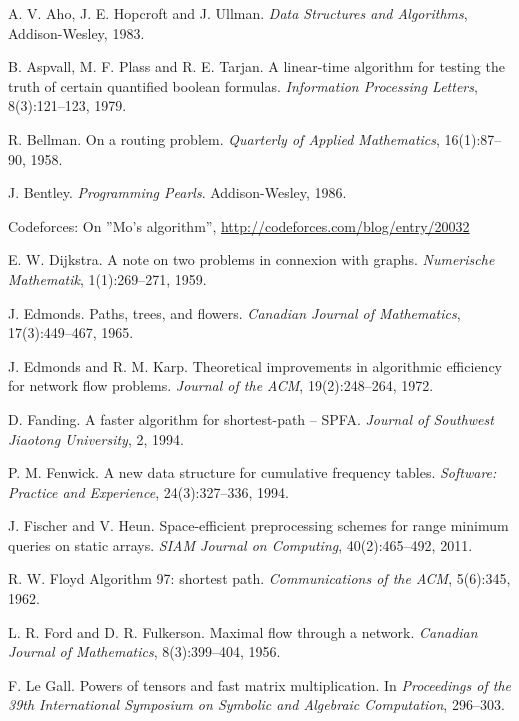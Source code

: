 \begin{thebibliography}{9}

  A. V. Aho, J. E. Hopcroft and J. Ullman.
  \emph{Data Structures and Algorithms},
  Addison-Wesley, 1983.

  B. Aspvall, M. F. Plass and R. E. Tarjan.
  A linear-time algorithm for testing the truth of certain quantified boolean formulas.
  \emph{Information Processing Letters}, 8(3):121--123, 1979.

  R. Bellman.
  On a routing problem.
  \emph{Quarterly of Applied Mathematics}, 16(1):87--90, 1958.

  J. Bentley.
  \emph{Programming Pearls}.
  Addison-Wesley, 1986.

  Codeforces: On ''Mo's algorithm'',
  \url{http://codeforces.com/blog/entry/20032}

  E. W. Dijkstra.
  A note on two problems in connexion with graphs.
  \emph{Numerische Mathematik}, 1(1):269--271, 1959.

  J. Edmonds.
  Paths, trees, and flowers.
  \emph{Canadian Journal of Mathematics}, 17(3):449--467, 1965.

  J. Edmonds and R. M. Karp.
  Theoretical improvements in algorithmic efficiency for network flow problems.
  \emph{Journal of the ACM}, 19(2):248--264, 1972.

  D. Fanding.
  A faster algorithm for shortest-path -- SPFA.
  \emph{Journal of Southwest Jiaotong University}, 2, 1994.

  P. M. Fenwick.
  A new data structure for cumulative frequency tables.
  \emph{Software: Practice and Experience}, 24(3):327--336, 1994.

  J. Fischer and V. Heun.
  Space-efficient preprocessing schemes for range minimum queries on static arrays.
  \emph{SIAM Journal on Computing}, 40(2):465--492, 2011.

  R. W. Floyd
  Algorithm 97: shortest path.
  \emph{Communications of the ACM}, 5(6):345, 1962.

  L. R. Ford and D. R. Fulkerson.
  Maximal flow through a network.
  \emph{Canadian Journal of Mathematics}, 8(3):399--404, 1956.

  F. Le Gall.
  Powers of tensors and fast matrix multiplication.
  In \emph{Proceedings of the 39th International Symposium on Symbolic and Algebraic Computation},
  296--303.


\end{thebibliography}
